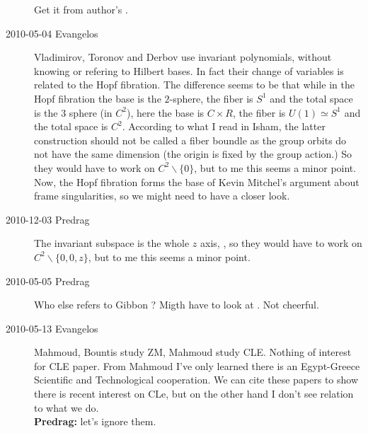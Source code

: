 \begin{description}
Get it from author's
.

\item[2010-05-04 Evangelos] Vladimirov, Toronov and
Derbov use
invariant polynomials, without knowing or refering to Hilbert bases.
In fact their change of variables is related to the
Hopf fibration. The difference seems to be that while
in the Hopf fibration the base is the $2$-sphere, the
fiber is $S^1$ and the total space is the $3$
sphere (in $C^2$), here the base is $C\times R$, the fiber
is $U(1)\simeq S^1$ and the total space is $C^2$.
According to what I read in Isham, the latter
construction should not be called a fiber boundle
as the group orbits do not have the same dimension
(the origin is fixed by the group action.) So they would
have to work on $C^2\backslash \{0\}$, but to me this
seems a minor point. Now, the Hopf fibration forms
the base of Kevin Mitchel's argument about frame
singularities, so we might need to have a closer look.

\item[2010-12-03  Predrag] The invariant subspace is the whole
$z$ axis, \ie, so they would have to work on
$C^2\backslash \{0,0,z\}$, but to me this
seems a minor point.


\item[2010-05-05  Predrag]
Who else refers to Gibbon
\etal{}?
Migth have to look at
.
Not cheerful.

\item[2010-05-13  Evangelos]

Mahmoud, Bountis \etal{} study ZM, Mahmoud \etal{} study CLE.
Nothing of interest for CLE paper.
From Mahmoud \etal{} I've only learned there is an Egypt-Greece Scientific
and Technological cooperation. We can cite these papers to show there is recent interest
on CLe, but on the other hand I don't see relation to what we do.
\\
{\bf Predrag:} let's ignore them.


\end{description}
